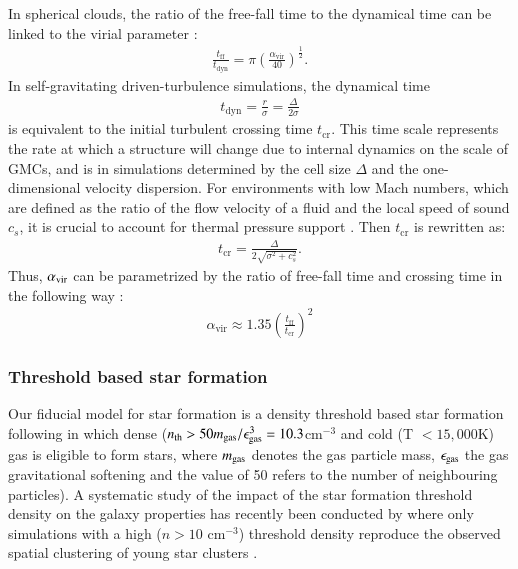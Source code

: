 \documentclass{aa}
\begin{document}
In spherical clouds, the ratio of the free-fall time to the dynamical time can be linked to the virial parameter \citep[e.g.][]{Evans_2022}:
\begin{align}
    \frac{t_{\mathrm{ff}}}{t_{\mathrm{dyn}}} = \pi \left(\frac{\alpha_{\mathrm{vir}}}{40}\right)^{\frac{1}{2}}.
\end{align}
In self-gravitating driven-turbulence simulations, the dynamical time
\begin{align}
t_{\mathrm{dyn}} = \frac{ r } {\sigma} = \frac{ \Delta } {2 \sigma}
\end{align}
is equivalent to the initial turbulent crossing time $t_{\mathrm{cr}}$. This time scale represents the rate at which a structure will change due to internal dynamics on the scale of GMCs, and is in simulations determined by the cell size $\Delta$ and the one-dimensional velocity dispersion. For environments with low Mach numbers, which are defined as the ratio of the flow velocity of a fluid and the local speed of sound $c_s$, it is crucial to account for thermal pressure support \citep{Chandrasekhar_1951}. Then $t_{\mathrm{cr}}$ is rewritten as:
\begin{align}
t_{\mathrm{cr}} = \frac{ \Delta } { 2 \sqrt{\sigma^2+c_s^2}}.
\end{align} 
Thus, $\alpha_{\rm vir}$ can be parametrized by the ratio of free-fall time and crossing time in the following way \citep{Bertoldi_1992}:
\begin{align}
\label{eq: alpha_sem}
    \alpha_{\mathrm{vir}} \approx 1.35 \left(\frac{t_{\mathrm{ff}}}{t_{\mathrm{cr}}}\right)^2
\end{align}

\subsubsection{Threshold based star formation}

Our fiducial model for star formation is a density threshold based star formation following \citet{Stinson2006} in which dense ($n_{\rm  th}  > 50 m_{\rm  gas}/\epsilon_{\rm gas}^3 = 10.3$cm$^{-3}$ and cold (T $< 15,000$K) gas is eligible to form stars, where $m_{\rm gas}$ denotes the gas particle mass, $\epsilon_{\rm gas}$ the gas gravitational softening and the value of 50 refers to the number of neighbouring particles). A systematic study of the impact of the star formation threshold density on the galaxy properties has recently been conducted by \citet{Dutton2019,Dutton2020} where only simulations with a high ($n>10$ cm$^{-3}$) threshold density reproduce the observed spatial clustering of young star clusters \citep{Buck2019}. 
\end{document}
